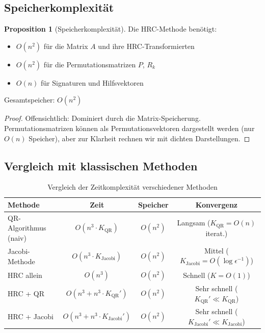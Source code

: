 \documentclass[a4paper,12pt]{article}
\theoremstyle{definition}
\newtheorem{proposition}{Proposition}
\begin{document}
\subsection{Speicherkomplexität}

\begin{proposition}[Speicherkomplexität]
Die HRC-Methode benötigt:
\begin{itemize}
	\item $O(n^2)$ für die Matrix $A$ und ihre HRC-Transformierten
	\item $O(n^2)$ für die Permutationsmatrizen $P$, $R_k$
	\item $O(n)$ für Signaturen und Hilfsvektoren
\end{itemize}

Gesamtspeicher: $O(n^2)$
\end{proposition}

\begin{proof}
Offensichtlich: Dominiert durch die Matrix-Speicherung. Permutationsmatrizen können als Permutationsvektoren dargestellt werden (nur $O(n)$ Speicher), aber zur Klarheit rechnen wir mit dichten Darstellungen.
\end{proof}

\subsection{Vergleich mit klassischen Methoden}

\begin{table}[H]
\centering
\caption{Vergleich der Zeitkomplexität verschiedener Methoden}
\label{tab:complexity_comparison}
\begin{tabular}{|l|c|c|c|}
\hline
\textbf{Methode} & \textbf{Zeit} & \textbf{Speicher} & \textbf{Konvergenz} \\
\hline
QR-Algorithmus (naiv) & $O(n^3 \cdot K_{\text{QR}})$ & $O(n^2)$ & Langsam ($K_{\text{QR}} = O(n)$ iterat.) \\
\hline
Jacobi-Methode & $O(n^3 \cdot K_{\text{Jacobi}})$ & $O(n^2)$ & Mittel ($K_{\text{Jacobi}} = O(\log \epsilon^{-1})$) \\
\hline
HRC allein & $O(n^3)$ & $O(n^2)$ & Schnell ($K = O(1)$) \\
\hline
HRC + QR & $O(n^3 + n^3 \cdot K_{\text{QR}}')$ & $O(n^2)$ & Sehr schnell ($K_{\text{QR}}' \ll K_{\text{QR}}$) \\
\hline
HRC + Jacobi & $O(n^3 + n^3 \cdot K_{\text{Jacobi}}')$ & $O(n^2)$ & Sehr schnell ($K_{\text{Jacobi}}' \ll K_{\text{Jacobi}}$) \\
\hline
\end{tabular}
\end{table}
\end{document}
